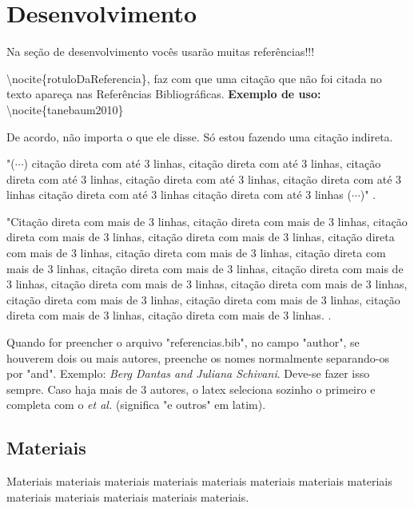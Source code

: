 \documentclass[article,12pt,oneside,a4paper,english,brazil,sumario=tradicional]{abntex2}
\begin{document}
\section{Desenvolvimento}
Na se\c c\~ao de desenvolvimento voc\^es usar\~ao muitas refer\^encias!!!

\textbackslash nocite\{rotuloDaReferencia\}, faz com que uma cita\c c\~ao que n\~ao foi citada no texto apare\c ca nas Refer\^encias Bibliogr\'aficas. \textbf{Exemplo de uso:} \textbackslash nocite\{tanebaum2010\} 

De acordo, n\~ao importa o que ele disse. S\'o estou fazendo uma cita\c c\~ao indireta. 

"($\cdots$) cita\c c\~ao direta com at\'e 3 linhas, cita\c c\~ao direta com at\'e 3 linhas, cita\c c\~ao direta com at\'e 3 linhas, cita\c c\~ao direta com at\'e 3 linhas, cita\c c\~ao direta com at\'e 3 linhas cita\c c\~ao direta com at\'e 3 linhas cita\c c\~ao direta com at\'e 3 linhas ($\cdots$)" \cite[p.~34]{tanebaum2010}. 
 
\vspace{24pt} %
\begin{citacao}
"Cita\c c\~ao direta com mais de 3 linhas, cita\c c\~ao direta com mais de 3 linhas, cita\c c\~ao direta com mais de 3 linhas, cita\c c\~ao direta com mais de 3 linhas, cita\c c\~ao direta com mais de 3 linhas, cita\c c\~ao direta com mais de 3 linhas, cita\c c\~ao direta com mais de 3 linhas, cita\c c\~ao direta com mais de 3 linhas, cita\c c\~ao direta com mais de 3 linhas, cita\c c\~ao direta com mais de 3 linhas, cita\c c\~ao direta com mais de 3 linhas, cita\c c\~ao direta com mais de 3 linhas, cita\c c\~ao direta com mais de 3 linhas, cita\c c\~ao direta com mais de 3 linhas, cita\c c\~ao direta com mais de 3 linhas. \cite[p.~34]{tanebaum2010}. 
\end{citacao}
\vspace{24pt} %

Quando for preencher o arquivo "referencias.bib", no campo "author", se houverem dois ou mais autores, preenche os nomes normalmente separando-os por "and". Exemplo: \textit{Berg Dantas and Juliana Schivani}. Deve-se fazer isso sempre. Caso haja mais de 3 autores, o latex seleciona sozinho o primeiro e completa com o \textit{et al.} (significa "e outros" em latim). 

 
\subsection{Materiais}
Materiais materiais materiais materiais materiais materiais materiais materiais materiais materiais materiais materiais materiais.
\end{document}
